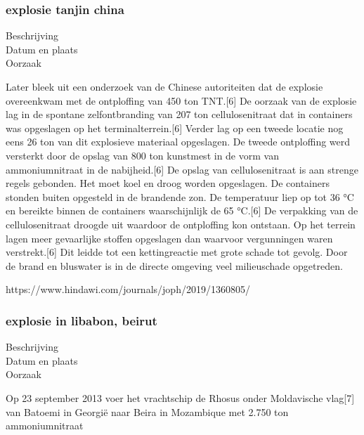 \subsubsection{explosie tanjin china }

	\begin{description}
	\item[Beschrijving]
	\item[Datum en plaats] 
	\item[Oorzaak]
\end{description}

Later bleek uit een onderzoek van de Chinese autoriteiten dat de explosie overeenkwam met de ontploffing van 450 ton TNT.[6] 
De oorzaak van de explosie lag in de spontane zelfontbranding van 207 ton cellulosenitraat dat in containers was opgeslagen op het terminalterrein.[6] 
Verder lag op een tweede locatie nog eens 26 ton van dit explosieve materiaal opgeslagen.
De tweede ontploffing werd versterkt door de opslag van 800 ton kunstmest in de vorm van ammoniumnitraat in de nabijheid.[6]
De opslag van cellulosenitraat is aan strenge regels gebonden. Het moet koel en droog worden opgeslagen. De containers stonden buiten opgesteld in de brandende zon. De temperatuur liep op tot 36 °C en bereikte binnen de containers waarschijnlijk de 65 °C.[6] De verpakking van de cellulosenitraat droogde uit waardoor de ontploffing kon ontstaan. Op het terrein lagen meer gevaarlijke stoffen opgeslagen dan waarvoor vergunningen waren verstrekt.[6] Dit leidde tot een kettingreactie met grote schade tot gevolg. Door de brand en bluswater is in de directe omgeving veel milieuschade opgetreden.


https://www.hindawi.com/journals/joph/2019/1360805/ 



\subsubsection{explosie in libabon, beirut }
	\begin{description}
	\item[Beschrijving]
	\item[Datum en plaats] 
	\item[Oorzaak]
\end{description}
Op 23 september 2013 voer het vrachtschip de Rhosus onder Moldavische vlag[7] van Batoemi in Georgië naar Beira in Mozambique met 2.750 ton ammoniumnitraat

